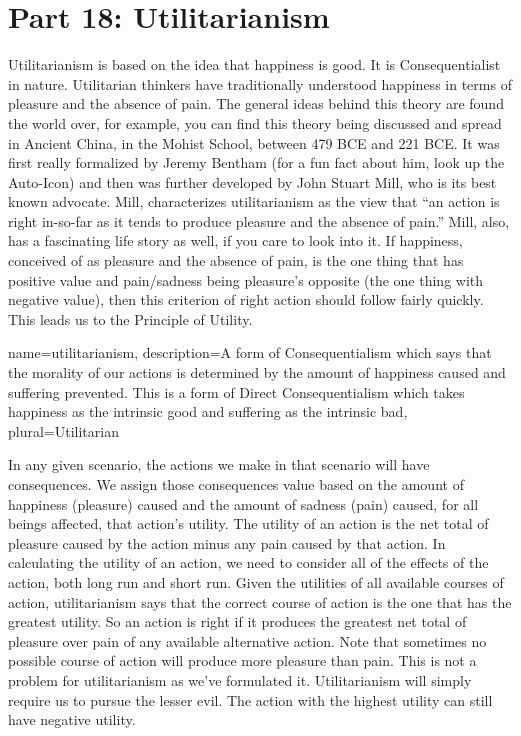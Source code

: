 \chapter{Part 18: Utilitarianism}

Utilitarianism is based on the idea that happiness is good. It is Consequentialist in nature. Utilitarian thinkers have traditionally understood happiness in terms of pleasure and the absence of pain. The general ideas behind this theory are found the world over, for example, you can find this theory being discussed and spread in Ancient China, in the Mohist School, between 479 BCE and 221 BCE. It was first really formalized by Jeremy Bentham (for a fun fact about him, look up the Auto-Icon) and then was further developed by John Stuart Mill, who is its best known advocate. Mill, characterizes \gls{utilitarianism} as the view that “an action is right in-so-far as it tends to produce pleasure and the absence of pain.” Mill, also, has a fascinating life story as well, if you care to look into it.  If happiness, conceived of as pleasure and the absence of pain, is the one thing that has positive value and pain/sadness being pleasure's opposite (the one thing with negative value), then this criterion of right action should follow fairly quickly. This leads us to the Principle of Utility.

{
  name=utilitarianism,
  description={A form of Consequentialism which says that the morality of our actions is determined by the amount of happiness caused and suffering prevented. This is a form of Direct Consequentialism which takes happiness as the intrinsic good and suffering as the intrinsic bad},
  plural=Utilitarian
}


In any given scenario, the actions we make in that scenario will have consequences. We assign those consequences value based on the amount of happiness (pleasure) caused and the amount of sadness (pain) caused, for all beings affected, that action's utility. The utility of an action is the net total of pleasure caused by the action minus any pain caused by that action. In calculating the utility of an action, we need to consider all of the effects of the action, both long run and short run. Given the utilities of all available courses of action, utilitarianism says that the correct course of action is the one that has the greatest utility. So an action is right if it produces the greatest net total of pleasure over pain of any available alternative action. Note that sometimes no possible course of action will produce more pleasure than pain. This is not a problem for utilitarianism as we’ve formulated it. Utilitarianism will simply require us to pursue the lesser evil. The action with the highest utility can still have negative utility.

